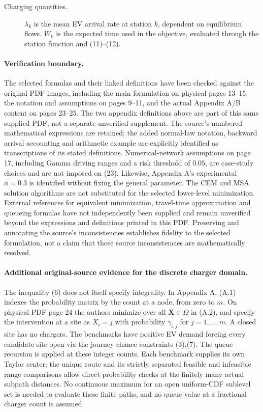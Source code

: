 \documentclass{article}
\begin{document}
\begin{description}
\item[Charging quantities.] $\lambda_k$ is the mean EV arrival rate at station $k$, dependent on equilibrium flows. $W_k$ is the expected time used in the objective, evaluated through the station function and (11)--(12).
\end{description}

\paragraph{Verification boundary.}
The selected formulas and their linked definitions have been checked against the original PDF images, including the main formulation on physical pages 13--15, the notation and assumptions on pages 9--11, and the actual Appendix A/B content on pages 23--25. The two appendix definitions above are part of this same supplied PDF, not a separate unverified supplement. The source's numbered mathematical expressions are retained; the added normal-law notation, backward arrival accounting and arithmetic example are explicitly identified as transcriptions of its stated definitions. Numerical-network assumptions on page 17, including Gamma driving ranges and a risk threshold of $0.05$, are case-study choices and are not imposed on (23). Likewise, Appendix A's experimental $\phi=0.3$ is identified without fixing the general parameter. The CEM and MSA solution algorithms are not substituted for the selected lower-level minimization. External references for equivalent minimization, travel-time approximation and queueing formulas have not independently been supplied and remain unverified beyond the expressions and definitions printed in this PDF. Preserving and annotating the source's inconsistencies establishes fidelity to the selected formulation, not a claim that those source inconsistencies are mathematically resolved.


\paragraph{Additional original-source evidence for the discrete charger domain.}
The inequality (6) does not itself specify integrality. In Appendix A, (A.1)
indexes the probability matrix by the count at a node, from zero to \(m\).
On physical PDF page 24 the authors minimize over all \(\mathbf X\in\Omega\)
in (A.2), and specify the intervention at a site as \(X_i=j\) with
probability \(\gamma_{i,j}\) for \(j=1,\ldots,m\). A closed site has no chargers.
The benchmarks have positive EV demand forcing every candidate site open via
the journey chance constraints (3),(7). The queue recursion is applied at these
integer counts. Each benchmark supplies its own Taylor center; the unique route
and its strictly separated feasible and infeasible range comparisons allow
direct probability checks at the finitely many actual subpath distances.
No continuous maximum for an open uniform-CDF sublevel set is needed to evaluate
these finite paths, and no queue value at a fractional charger count is assumed.
\end{document}

